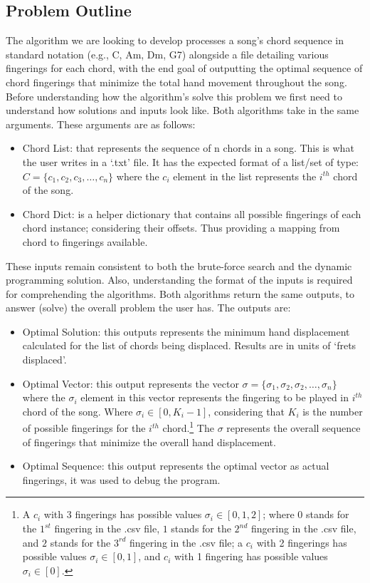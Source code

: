 \documentclass[conference]{IEEEtran}
\begin{document}
\subsection{Problem Outline}
The algorithm we are looking to develop processes a song's chord sequence in standard notation (e.g., C, Am, Dm, G7) alongside a file detailing various fingerings for each chord, with the end goal of outputting the optimal sequence of chord fingerings that minimize the total hand movement throughout the song. Before understanding how the algorithm's solve this problem we first need to understand how solutions and inputs look like.
\newline 
\indent Both algorithms take in the same arguments. These arguments are as follows:
\begin{itemize}
    \item Chord List: that represents the sequence of n chords in a song. This is what the user writes in a `.txt' file. It has the expected format of a list/set of type:
    \( C = \{c_1, c_2, c_3, \dots, c_n\} \) where the \(c_i\) element in the list represents the \(i^{th}\) chord of the song.
    \item Chord Dict: is a helper dictionary that contains all possible fingerings of each chord instance; considering their offsets. Thus providing a mapping from chord to fingerings available. 
\end{itemize}
\indent These inputs remain consistent to both the brute-force search and the dynamic programming solution. Also, understanding the format of the inputs is required for comprehending the algorithms.
\newline
\indent Both algorithms return the same outputs, to answer (solve) the overall problem the user has. The outputs are:
\begin{itemize}
    \item Optimal Solution: this outputs represents the minimum hand displacement calculated for the list of chords being displaced. Results are in units of `frets displaced'.
    \item Optimal Vector: this output represents the vector \(\sigma = \{\sigma_1, \sigma_2, \sigma_2, \ldots, \sigma_n\} \) where the \(\sigma_i\) element in this vector represents the fingering to be played in \(i^{th}\) chord of the song. Where \( \sigma_i \in [0, K_i - 1] \), considering that \( K_i \) is the number of possible fingerings for the \(i^{th}\) chord.\footnote[2]{A \(c_i\) with 3 fingerings has possible values \(\sigma_i \in [0, 1, 2] \); where $0$ stands for the $1^{st}$ fingering in the .csv file, $1$ stands for the $2^{nd}$ fingering in the .csv file, and $2$ stands for the $3^{rd}$ fingering in the .csv file; a \(c_i\) with 2 fingerings has possible values \(\sigma_i \in [0, 1] \), and \(c_i\) with 1 fingering has possible values \(\sigma_i \in [0] \).}
    The \(\sigma\) represents the overall sequence of fingerings that minimize the overall hand displacement. 
    \item Optimal Sequence: this output represents the optimal vector as actual fingerings, it was used to debug the program. 
\end{itemize}
\end{document}
